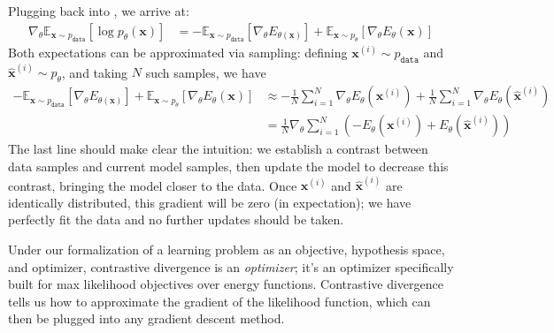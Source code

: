 Plugging \eqn{\ref{eqn:generative_models:cd_neg}} back into \eqn{\ref{eqn:generative_models:cd}}, we arrive at:
\begin{align}
    \nabla_{\theta} \mathbb{E}_{\mathbf{x} \sim p_{\texttt{data}}}[\log p_{\theta}(\mathbf{x})] &= -\mathbb{E}_{\mathbf{x} \sim p_{\texttt{data}}}[\nabla_{\theta}E_{\theta(\mathbf{x})}] + \mathbb{E}_{\mathbf{x} \sim p_{\theta}}[\nabla_{\theta} E_{\theta}(\mathbf{x})]
\end{align}
Both expectations can be approximated via sampling: defining $\mathbf{x}^{(i)} \sim p_{\texttt{data}}$ and $\hat{\mathbf{x}}^{(i)} \sim p_{\theta}$, and taking $N$ such samples, we have
\begin{align}
    -\mathbb{E}_{\mathbf{x} \sim p_{\texttt{data}}}[\nabla_{\theta}E_{\theta(\mathbf{x})}] + \mathbb{E}_{\mathbf{x} \sim p_{\theta}}[\nabla_{\theta} E_{\theta}(\mathbf{x})] &\approx -\frac{1}{N} \sum_{i=1}^N \nabla_{\theta}E_{\theta}(\mathbf{x}^{(i)}) + \frac{1}{N} \sum_{i=1}^N \nabla_{\theta}E_{\theta}(\hat{\mathbf{x}}^{(i)})\\
    &= \frac{1}{N} \nabla_{\theta} \sum_{i=1}^N (-E_{\theta}(\mathbf{x}^{(i)}) + E_{\theta}(\hat{\mathbf{x}}^{(i)}))
\end{align}
The last line should make clear the intuition: we establish a contrast between data samples and current model samples, then update the model to decrease this contrast, bringing the model closer to the data. Once $\mathbf{x}^{(i)}$ and $\hat{\mathbf{x}}^{(i)}$ are identically distributed, this gradient will be zero (in expectation); we have perfectly fit the data and no further updates should be taken.

Under our formalization of a learning problem as an objective, hypothesis space, and optimizer, contrastive divergence is an \textit{optimizer}; it's an optimizer specifically built for max likelihood objectives over energy functions. Contrastive divergence tells us how to approximate the gradient of the likelihood function, which can then be plugged into any gradient descent method.


